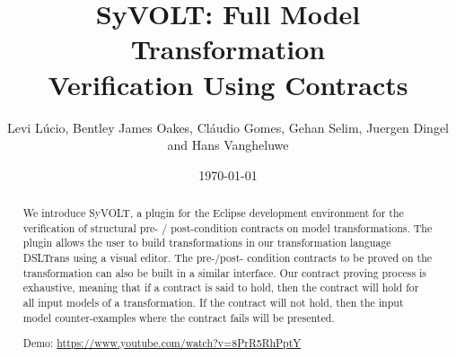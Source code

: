 \documentclass[conference]{IEEEtran}
\begin{document}
\title{SyVOLT: Full Model Transformation\\Verification Using Contracts}
\author{Levi L\'{u}cio, Bentley James Oakes, Cl\'{a}udio Gomes, Gehan Selim,
Juergen Dingel and Hans Vangheluwe}

\author{
	} 

\date{\today}


\maketitle 




\begin{abstract}
 
We introduce SyVOLT, a plugin for the Eclipse development environment for the
verification of structural pre- / post-condition contracts on model
transformations. The plugin allows the user to build transformations in our
transformation language DSLTrans using a visual editor. The pre-/post- condition
contracts to be proved on the transformation can also be built in a similar
interface. Our contract proving process is exhaustive, meaning that if a
contract is said to hold, then the contract will hold for all input models of a
transformation. If the contract will not hold, then the input model
counter-examples where the contract fails will be presented.

Demo: \url{https://www.youtube.com/watch?v=8PrR5RhPptY}



\end{abstract}
\end{document}
